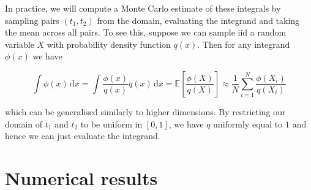 In practice, we will compute a Monte Carlo estimate of these integrals by sampling pairs $(t_1, t_2)$ from the domain, evaluating the integrand and taking the mean across all pairs. To see this, suppose we can sample iid a random variable $X$ with probability density function $q(x)$. Then for any integrand $\phi(x)$ we have
    
\[
\int \phi(x)\,\mathrm dx = \int\frac{\phi(x)}{q(x)}q(x) \,\mathrm dx = \mathbb E\left[\frac{\phi(X)}{q(X)}\right] \approx \frac 1N\sum_{i=1}^N\frac{\phi(X_i)}{q(X_i)}
\]

which can be generalised similarly to higher dimensions. By restricting our domain of $t_1$ and $t_2$ to be uniform in $[0, 1]$, we have $q$ uniformly equal to $1$ and hence we can just evaluate the integrand.


\section{Numerical results}
